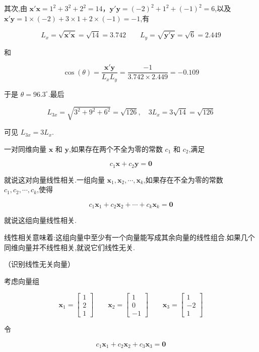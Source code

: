 其次,由 $\bm{x}'\bm{x} = 1^2 + 3^2 + 2^2 = 14$，$\bm{y}'\bm{y} = (-2)^2 + 1^2 + (-1)^2 = 6$,以及 $\bm{x}'\bm{y} = 1 \times (-2) + 3 \times 1 + 2 \times (-1) = -1$,有

\[
L_x = \sqrt{\bm{x}'\bm{x}} = \sqrt{14} = 3.742 \qquad L_y = \sqrt{\bm{y}'\bm{y}} = \sqrt{6} = 2.449
\]

和

\[
\cos(\theta) = \frac{\bm{x}'\bm{y}}{L_xL_y} = \frac{-1}{3.742 \times 2.449} = -0.109
\]

于是 $\theta = 96.3^\circ$.最后

\[
L_{3x} = \sqrt{3^2 + 9^2 + 6^2} = \sqrt{126}, \quad 3L_x = 3\sqrt{14} = \sqrt{126}
\]

可见 $L_{3x} = 3L_x$.

一对同维向量 $\bm{x}$ 和 $\bm{y}$,如果存在两个不全为零的常数 $c_1$ 和 $c_2$,满足

\label{eq:2-7}
\begin{equation}
c_1\bm{x} + c_2\bm{y} = \bm{0} \tag{2-7}
\end{equation}

就说这对向量线性相关.一组向量 $\bm{x}_1, \bm{x}_2, \cdots, \bm{x}_k$,如果存在不全为零的常数 $c_1, c_2, \cdots, c_k$,使得

\[
c_1\bm{x}_1 + c_2\bm{x}_2 + \cdots + c_k\bm{x}_k = \bm{0}
\]

就说这组向量线性相关.

线性相关意味着:这组向量中至少有一个向量能写成其余向量的线性组合.如果几个同维向量并不线性相关,就说它们线性无关.

 （识别线性无关向量）

考虑向量组

\[
\bm{x}_1 = \begin{bmatrix} 1 \\ 2 \\ 1 \end{bmatrix} \qquad \bm{x}_2 = \begin{bmatrix} 1 \\ 0 \\ -1 \end{bmatrix} \qquad \bm{x}_3 = \begin{bmatrix} 1 \\ -2 \\ 1 \end{bmatrix}
\]

令

\[
c_1\bm{x}_1 + c_2\bm{x}_2 + c_3\bm{x}_3 = \bm{0}
\]

